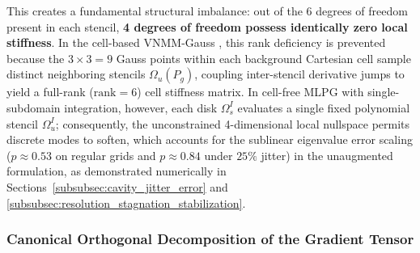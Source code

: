 \documentclass[preprint,12pt]{elsarticle}
\begin{document}
This creates a fundamental structural imbalance: out of the 6 degrees of freedom present in each stencil, \textbf{4 degrees of freedom possess identically zero local stiffness}. In the cell-based VNMM-Gauss \cite{stable_vnmm2d_2026}, this rank deficiency is prevented because the $3 \times 3 = 9$ Gauss points within each background Cartesian cell sample distinct neighboring stencils $\Omega_u(P_g)$, coupling inter-stencil derivative jumps to yield a full-rank ($\mathrm{rank} = 6$) cell stiffness matrix. In cell-free MLPG with single-subdomain integration, however, each disk $\Omega_s^I$ evaluates a single fixed polynomial stencil $\Omega_u^I$; consequently, the unconstrained 4-dimensional local nullspace permits discrete modes to soften, which accounts for the sublinear eigenvalue error scaling ($p \approx 0.53$ on regular grids and $p \approx 0.84$ under $25\%$ jitter) in the unaugmented formulation, as demonstrated numerically in Sections~\ref{subsubsec:cavity_jitter_error} and \ref{subsubsec:resolution_stagnation_stabilization}.

\subsubsection{Canonical Orthogonal Decomposition of the Gradient Tensor}
\label{subsubsec:canonical_decomposition}
\end{document}
